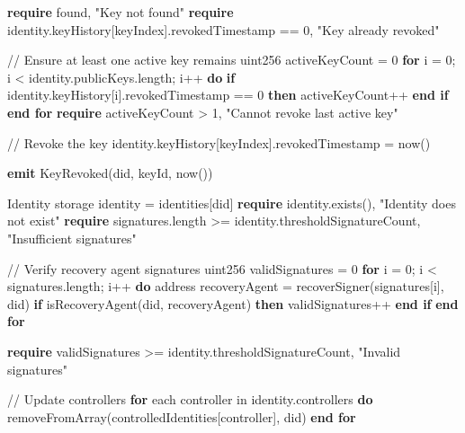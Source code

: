 \documentclass[lettersize,journal]{IEEEtran}
\begin{document}
\begin{itemize}
\begin{algorithm}[H]
\begin{algorithmic}[1]
    \State \textbf{require} found, "Key not found"
    \State \textbf{require} identity.keyHistory[keyIndex].revokedTimestamp == 0, "Key already revoked"
    
    \State // Ensure at least one active key remains
    \State uint256 activeKeyCount = 0
    \State \textbf{for} i = 0; i < identity.publicKeys.length; i++ \textbf{do}
        \State \hspace{\algorithmicindent} \textbf{if} identity.keyHistory[i].revokedTimestamp == 0 \textbf{then}
            \State \hspace{\algorithmicindent}\hspace{\algorithmicindent} activeKeyCount++
        \State \hspace{\algorithmicindent} \textbf{end if}
    \State \textbf{end for}
    \State \textbf{require} activeKeyCount > 1, "Cannot revoke last active key"
    
    \State // Revoke the key
    \State identity.keyHistory[keyIndex].revokedTimestamp = now()
    
    \State \textbf{emit} KeyRevoked(did, keyId, now())
\EndFunction
\Statex 

    \State Identity storage identity = identities[did]
    \State \textbf{require} identity.exists(), "Identity does not exist"
    \State \textbf{require} signatures.length >= identity.thresholdSignatureCount, "Insufficient signatures"
    
    \State // Verify recovery agent signatures
    \State uint256 validSignatures = 0
    \State \textbf{for} i = 0; i < signatures.length; i++ \textbf{do}
        \State \hspace{\algorithmicindent} address recoveryAgent = recoverSigner(signatures[i], did)
        \State \hspace{\algorithmicindent} \textbf{if} isRecoveryAgent(did, recoveryAgent) \textbf{then}
            \State \hspace{\algorithmicindent}\hspace{\algorithmicindent} validSignatures++
        \State \hspace{\algorithmicindent} \textbf{end if}
    \State \textbf{end for}
    
    \State \textbf{require} validSignatures >= identity.thresholdSignatureCount, "Invalid signatures"
    
    \State // Update controllers
    \State \textbf{for} each controller in identity.controllers \textbf{do}
        \State \hspace{\algorithmicindent} removeFromArray(controlledIdentities[controller], did)
    \State \textbf{end for}
    

\end{algorithmic}
\end{algorithm}
\end{itemize}
\end{document}
